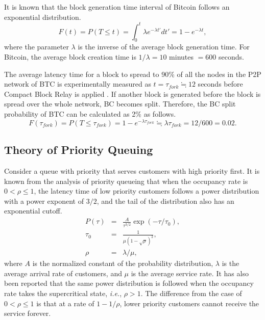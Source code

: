 \documentclass[graybox]{svmult}
\begin{document}
It is known that the block generation time interval of Bitcoin follows an exponential distribution. 
%
\begin{equation}
	F(t) = P(T \le t) = \int_{0}^{t} \lambda e^{-\lambda t'} dt' = 1 - e^{-\lambda t}, \label{eq:exp}
\end{equation}
where the parameter $\lambda$ is the inverse of the average block generation time.
For Bitcoin, the average block creation time is $1 / \lambda = 10$ minutes $= 600$ seconds.


The average latency time for a block to spread to 90\% of all the nodes in the P2P network of BTC is experimentally measured as $t = \tau_{fork} \fallingdotseq 12$ seconds before Compact Block Relay is applied \cite{bloX}. 
If another block is generated before the block is spread over the whole network, BC becomes split. 
Therefore, the BC split probability of BTC can be calculated as 2\% as follows.
%
\begin{equation}
  F(\tau_{fork}) = P(T \le \tau_{fork}) = 1 - e^{-\lambda \tau_{fork}} \fallingdotseq \lambda \tau_{fork} = 12/600 = 0.02. 
\end{equation}
%



\subsection{Theory of Priority Queuing}
\label{sec:priorityqueue}

Consider a queue with priority that serves customers with high priority first. 
It is known from the analysis of priority queueing that when the occupancy rate is $0 < \rho \le1 $, the latency time of low priority customers follows a power distribution with a power exponent of $3/2$, and the tail of the distribution also has an exponential cutoff\cite{OB2005}. 
%
\begin{eqnarray}
  P(\tau) &=& \frac{A}{\tau^{3/2}} \exp(-\tau/\tau_0), \\
  \tau_0  &=& \frac{1}{\mu (1-\sqrt{\rho})^2}, \\
  \rho    &=& \lambda / \mu,
\end{eqnarray}
%
where $A$ is the normalized constant of the probability distribution, $\lambda$ is the average arrival rate of customers, and $\mu$ is the average service rate.
It has also been reported that the same power distribution is followed when the occupancy rate takes the supercritical state, \textit{i.e.}, $\rho > 1$. 
The difference from the case of $0 < \rho \le 1$ is that at a rate of $1 -1 / \rho $, lower priority customers cannot receive the service forever. 
\end{document}
